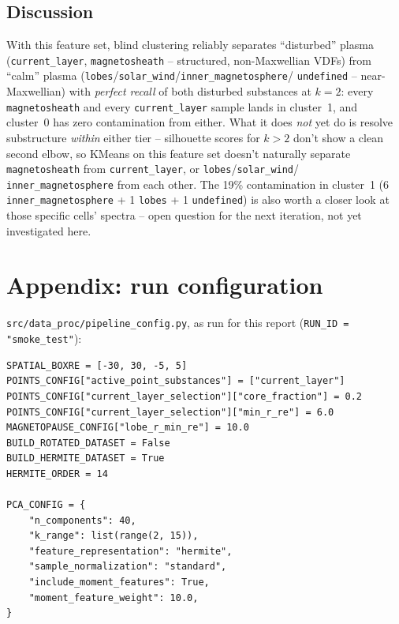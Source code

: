 \documentclass[11pt]{article}
\begin{document}
\subsection{Discussion}
With this feature set, blind clustering reliably separates
``disturbed'' plasma (\texttt{current\_layer}, \texttt{magnetosheath} --
structured, non-Maxwellian VDFs) from ``calm'' plasma
(\texttt{lobes}/\texttt{solar\_wind}/\texttt{inner\_magnetosphere}/
\texttt{undefined} -- near-Maxwellian) with \emph{perfect recall} of
both disturbed substances at $k=2$: every \texttt{magnetosheath} and
every \texttt{current\_layer} sample lands in cluster~1, and cluster~0
has zero contamination from either. What it does \emph{not} yet do is
resolve substructure \emph{within} either tier -- silhouette scores for
$k>2$ don't show a clean second elbow, so KMeans on this feature set
doesn't naturally separate \texttt{magnetosheath} from
\texttt{current\_layer}, or \texttt{lobes}/\texttt{solar\_wind}/
\texttt{inner\_magnetosphere} from each other. The 19\% contamination in
cluster~1 (6 \texttt{inner\_magnetosphere} + 1 \texttt{lobes} + 1
\texttt{undefined}) is also worth a closer look at those specific
cells' spectra -- open question for the next iteration, not yet
investigated here.

\section*{Appendix: run configuration}
\texttt{src/data\_proc/pipeline\_config.py}, as run for this report
(\texttt{RUN\_ID = "smoke\_test"}):
\begin{verbatim}
SPATIAL_BOXRE = [-30, 30, -5, 5]
POINTS_CONFIG["active_point_substances"] = ["current_layer"]
POINTS_CONFIG["current_layer_selection"]["core_fraction"] = 0.2
POINTS_CONFIG["current_layer_selection"]["min_r_re"] = 6.0
MAGNETOPAUSE_CONFIG["lobe_r_min_re"] = 10.0
BUILD_ROTATED_DATASET = False
BUILD_HERMITE_DATASET = True
HERMITE_ORDER = 14

PCA_CONFIG = {
    "n_components": 40,
    "k_range": list(range(2, 15)),
    "feature_representation": "hermite",
    "sample_normalization": "standard",
    "include_moment_features": True,
    "moment_feature_weight": 10.0,
}
\end{verbatim}
\end{document}
